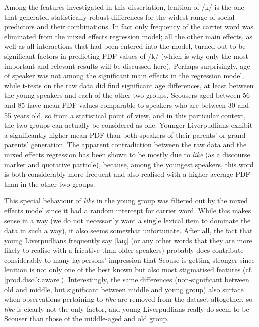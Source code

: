Among the features investigated in this dissertation, lenition of /k/ is the one that generated statistically robust differences for the widest range of social predictors and their combinations.
In fact only frequency of the carrier word was eliminated from the mixed effects regression model; all the other main effects, as well as all interactions that had been entered into the model, turned out to be significant factors in predicting PDF values of /k/ (which is why only the most important and relevant results will be discussed here).
Perhaps surprisingly, age of speaker was not among the significant main effects in the regression model, while t-tests on the raw data did find significant age differences, at least between the young speakers and each of the other two groups.
Scousers aged between 56 and 85 have mean PDF values comparable to speakers who are between 30 and 55 years old, so from a statistical point of view, and in this particular context, the two groups can actually be considered as one.
Younger Liverpudlians exhibit a significantly higher mean PDF than both speakers of their parents' or grand parents' generation.
The apparent contradiction between the raw data and the mixed effects regression has been shown to be mostly due to \emph{like} (as a discourse marker and quotative particle), because, among the youngest speakers, this word is both considerably more frequent and also realised with a higher average PDF than in the other two groups. 

This special behaviour of \emph{like} in the young group was filtered out by the mixed effects model since it had a random intercept for carrier word.
While this makes sense in a way (we do not necessarily want a single lexical item to dominate the data in such a way), it also seems somewhat unfortunate.
After all, the fact that young Liverpudlians frequently say [laɪç] (or any other words that they are more likely to realise with a fricative than older speakers) probably does contribute considerably to many laypersons' impression that Scouse is getting stronger since lenition is not only one of the best known but also most stigmatised features (cf. \ref{prod.disc.k.aware}).
Interestingly, the same differences (non-significant between old and middle, but significant between middle and young group) also surface when observations pertaining to \emph{like} are removed from the dataset altogether, so \emph{like} is clearly not the only factor, and young Liverpudlians really do seem to be Scouser than those of the middle-aged and old group.


